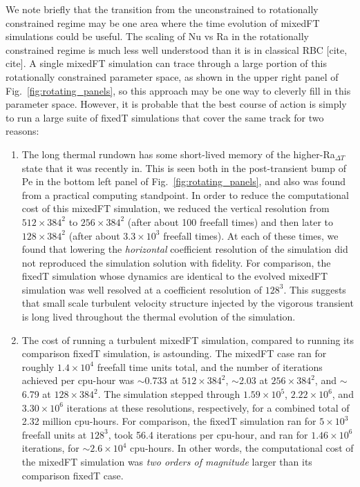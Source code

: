 \documentclass[aps, pre, onecolumn, nofootinbib, notitlepage, groupedaddress, amsfonts, amssymb, amsmath, longbibliography, superscriptaddress]{revtex4-1}
\begin{document}
We note briefly that the transition from the unconstrained to rotationally constrained regime may be one area where the time evolution of mixedFT simulations could be useful.
The scaling of Nu vs Ra in the rotationally constrained regime is much less well understood than it is in classical RBC [cite, cite].
A single mixedFT simulation can trace through a large portion of this rotationally constrained parameter space, as shown in the upper right panel of Fig.~\ref{fig:rotating_panels}, so this approach may be one way to cleverly fill in this parameter space.
However, it is probable that the best course of action is simply to run a large suite of fixedT simulations that cover the same track for two reasons:
\begin{enumerate}
\item The long thermal rundown has some short-lived memory of the higher-Ra$_{\Delta T}$ state that it was recently in.
This is seen both in the post-transient bump of Pe in the bottom left panel of Fig.~\ref{fig:rotating_panels}, and also was found from a practical computing standpoint.
In order to reduce the computational cost of this mixedFT simulation, we reduced the vertical resolution from $512\times384^2$ to $256\times384^2$ (after about 100 freefall times) and then later to $128\times384^2$ (after about $3.3 \times 10^3$ freefall times).
At each of these times, we found that lowering the \emph{horizontal} coefficient resolution of the simulation did not reproduced the simulation solution with fidelity.
For comparison, the fixedT simulation whose dynamics are identical to the evolved mixedFT simulation was well resolved at a coefficient resolution of $128^3$.
This suggests that small scale turbulent velocity structure injected by the vigorous transient is long lived throughout the thermal evolution of the simulation.
\item The cost of running a turbulent mixedFT simulation, compared to running its comparison fixedT simulation, is astounding.
The mixedFT case ran for roughly $1.4 \times 10^4$ freefall time units total, and the number of iterations achieved per cpu-hour was $\sim$0.733 at $512\times384^2$, $\sim$2.03 at $256\times384^2$, and $\sim$6.79 at $128\times384^2$.
The simulation stepped through $1.59 \times 10^5$, $2.22 \times 10^6$, and $3.30 \times 10^6$ iterations at these resolutions, respectively, for a combined total of 2.32 million cpu-hours.
For comparison, the fixedT simulation ran for $5 \times 10^3$ freefall units at $128^3$, took 56.4 iterations per cpu-hour, and ran for $1.46 \times 10^6$ iterations, for $\sim 2.6 \times 10^4$ cpu-hours.
In other words, the computational cost of the mixedFT simulation was \emph{two orders of magnitude} larger than its comparison fixedT case.
\end{enumerate}
\end{document}
